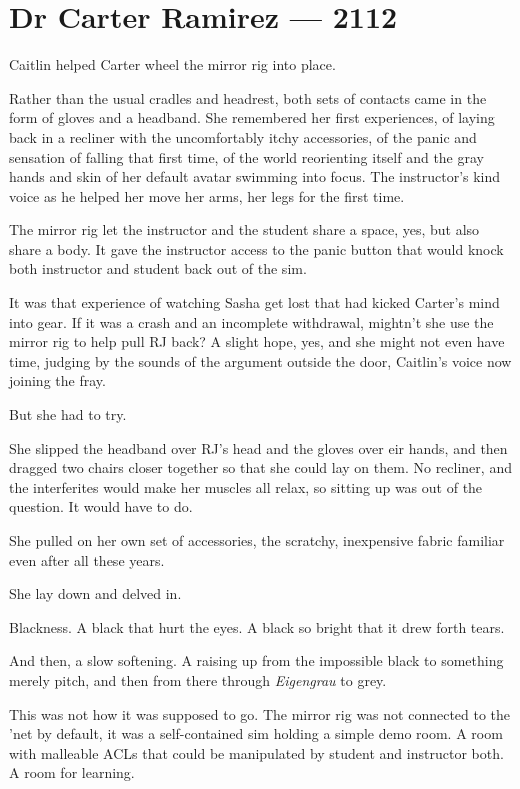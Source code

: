 \hypertarget{dr-carter-ramirez-2112}{%
\chapter*{Dr Carter Ramirez — 2112}\label{dr-carter-ramirez-2112}}

Caitlin helped Carter wheel the mirror rig into place.

Rather than the usual cradles and headrest, both sets of contacts came in the form of gloves and a headband. She remembered her first experiences, of laying back in a recliner with the uncomfortably itchy accessories, of the panic and sensation of falling that first time, of the world reorienting itself and the gray hands and skin of her default avatar swimming into focus. The instructor's kind voice as he helped her move her arms, her legs for the first time.

The mirror rig let the instructor and the student share a space, yes, but also share a body. It gave the instructor access to the panic button that would knock both instructor and student back out of the sim.

It was that experience of watching Sasha get lost that had kicked Carter's mind into gear. If it was a crash and an incomplete withdrawal, mightn't she use the mirror rig to help pull RJ back? A slight hope, yes, and she might not even have time, judging by the sounds of the argument outside the door, Caitlin's voice now joining the fray.

But she had to try.

She slipped the headband over RJ's head and the gloves over eir hands, and then dragged two chairs closer together so that she could lay on them. No recliner, and the interferites would make her muscles all relax, so sitting up was out of the question. It would have to do.

She pulled on her own set of accessories, the scratchy, inexpensive fabric familiar even after all these years.

She lay down and delved in.

Blackness. A black that hurt the eyes. A black so bright that it drew forth tears.

And then, a slow softening. A raising up from the impossible black to something merely pitch, and then from there through \emph{Eigengrau} to grey.

This was not how it was supposed to go. The mirror rig was not connected to the 'net by default, it was a self-contained sim holding a simple demo room. A room with malleable ACLs that could be manipulated by student and instructor both. A room for learning.

